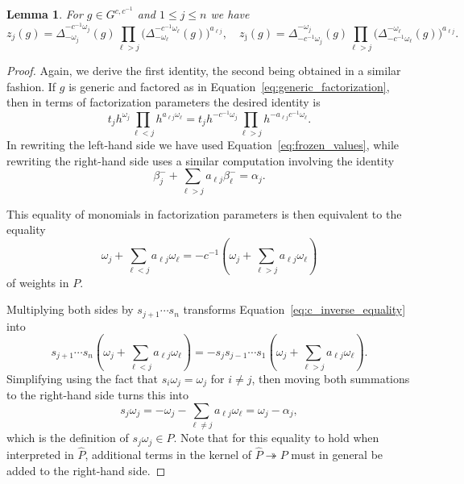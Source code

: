 \documentclass[12pt]{amsart}
\newcommand\onto{\twoheadrightarrow}
\newcommand{\ol}[1]{\overline{#1}}
\newcommand{\cvar}{z}
\newtheorem{lemma}[theorem]{Lemma}
\theoremstyle{remark}
\numberwithin{equation}{section}
\numberwithin{figure}{section}
\begin{document}
\begin{lemma}
  \label{lemma:coefficients_identities}
  For $g \in G^{c,c^{-1}}$ and $1 \leq j \leq n$ we have
  \begin{equation*}
    \cvar_j(g) 
    =
    \Delta_{-\omega_j}^{-c^{-1}\omega_j}(g)
    \prod_{\ell>j}\Big(\Delta_{-\omega_\ell}^{-c^{-1}\omega_\ell}(g)\Big)^{a_{\ell j}},
    \quad
    \cvar_{\ol{\jmath}}(g) 
    = 
    \Delta_{-c^{-1}\omega_j}^{-\omega_j}(g)
    \prod_{\ell>j}\Big(\Delta_{-c^{-1}\omega_\ell}^{-\omega_\ell}(g)\Big)^{a_{\ell j}}.
  \end{equation*}
\end{lemma}
\begin{proof}
  Again, we derive the first identity, the second being obtained in a similar fashion.
  If $g$ is generic and factored as in Equation~\ref{eq:generic_factorization}, then in terms of factorization parameters the desired identity is
  \begin{equation}
    t_j  h^{\omega_j} \prod_{\ell<j}h^{a_{\ell j}\omega_\ell} 
    = 
    t_j  h^{-c^{-1}\omega_j} \prod_{\ell>j}h^{-a_{\ell j}c^{-1}\omega_\ell}.
  \end{equation}
  In rewriting the left-hand side we have used Equation~\ref{eq:frozen_values}, while rewriting the right-hand side uses a similar computation involving the identity
  \[
    \beta_j^-+\sum_{\ell>j}a_{\ell j}\beta_\ell^-
    =
    \alpha_j.
  \]

  This equality of monomials in factorization parameters is then equivalent to the equality
  \begin{equation}
    \label{eq:c_inverse_equality}
    \omega_j + \sum_{\ell<j} a_{\ell j}\omega_\ell
    =
    -c^{-1}\left(\omega_j + \sum_{\ell>j} a_{\ell j}\omega_\ell\right)
  \end{equation}
  of weights in $P$.
  
  Multiplying both sides by $s_{j+1}\cdots s_n$ transforms Equation~\ref{eq:c_inverse_equality} into
  \[
    s_{j+1}\cdots s_n\left(\omega_j + \sum_{\ell<j} a_{\ell j}\omega_\ell\right)
    =
    -s_js_{j-1}\cdots s_1\left(\omega_j + \sum_{\ell>j} a_{\ell j}\omega_\ell\right).
  \]
  Simplifying using the fact that $s_i\omega_j=\omega_j$ for $i\neq j$, then moving both summations to the right-hand side turns this into
  \begin{equation}
    s_j\omega_j
    =
    -\omega_j-\sum_{\ell\neq j}a_{\ell j}\omega_\ell
    =
    \omega_j-\alpha_j,
  \end{equation}
  which is the definition of $s_j\omega_j \in P$.
  Note that for this equality to hold when interpreted in $\widehat{P}$, additional terms in the kernel of $\widehat{P} \onto P$ must in general be added to the right-hand side.
\end{proof}
\end{document}
